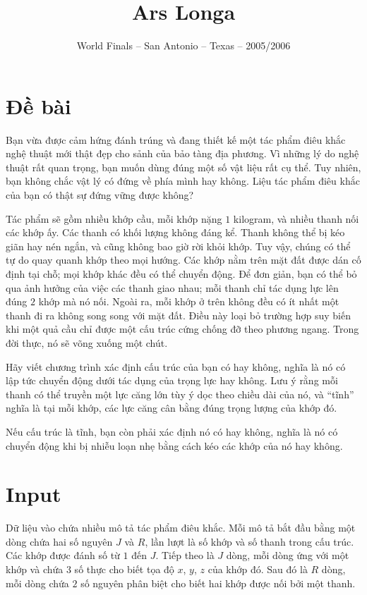 \documentclass[11pt]{article}
\title{Ars Longa}
\author{World Finals -- San Antonio -- Texas -- 2005/2006}
\date{}
\begin{document}
\maketitle


\section*{Đề bài}

Bạn vừa được cảm hứng đánh trúng và đang thiết kế một tác phẩm điêu khắc nghệ
thuật mới thật đẹp cho sảnh của bảo tàng địa phương. Vì những lý do nghệ thuật
rất quan trọng, bạn muốn dùng đúng một số vật liệu rất cụ thể. Tuy nhiên, bạn
không chắc vật lý có đứng về phía mình hay không. Liệu tác phẩm điêu khắc của
bạn có thật sự đứng vững được không?

Tác phẩm sẽ gồm nhiều khớp cầu, mỗi khớp nặng $1$ kilogram, và nhiều thanh nối
các khớp ấy. Các thanh có khối lượng không đáng kể. Thanh không thể bị kéo giãn
hay nén ngắn, và cũng không bao giờ rời khỏi khớp. Tuy vậy, chúng có thể tự do
quay quanh khớp theo mọi hướng. Các khớp nằm trên mặt đất được dán cố định tại
chỗ; mọi khớp khác đều có thể chuyển động. Để đơn giản, bạn có thể bỏ qua ảnh
hưởng của việc các thanh giao nhau; mỗi thanh chỉ tác dụng lực lên đúng $2$
khớp mà nó nối. Ngoài ra, mỗi khớp ở trên không đều có ít nhất một thanh đi ra
không song song với mặt đất. Điều này loại bỏ trường hợp suy biến khi một quả
cầu chỉ được một cấu trúc cứng chống đỡ theo phương ngang. Trong đời thực, nó
sẽ võng xuống một chút.

Hãy viết chương trình xác định cấu trúc của bạn có  hay không,
nghĩa là nó có lập tức chuyển động dưới tác dụng của trọng lực hay không. Lưu
ý rằng mỗi thanh có thể truyền một lực căng lớn tùy ý dọc theo chiều dài của
nó, và ``tĩnh'' nghĩa là tại mỗi khớp, các lực căng cân bằng đúng trọng lượng
của khớp đó.

Nếu cấu trúc là tĩnh, bạn còn phải xác định nó có  hay không,
nghĩa là nó có chuyển động khi bị nhiễu loạn nhẹ bằng cách kéo các khớp của nó
hay không.

\section*{Input}

Dữ liệu vào chứa nhiều mô tả tác phẩm điêu khắc. Mỗi mô tả bắt đầu bằng một
dòng chứa hai số nguyên $J$ và $R$, lần lượt là số khớp và số thanh trong cấu
trúc. Các khớp được đánh số từ $1$ đến $J$. Tiếp theo là $J$ dòng, mỗi dòng
ứng với một khớp và chứa $3$ số thực cho biết tọa độ $x$, $y$, $z$ của khớp
đó. Sau đó là $R$ dòng, mỗi dòng chứa $2$ số nguyên phân biệt cho biết hai
khớp được nối bởi một thanh.
\end{document}
